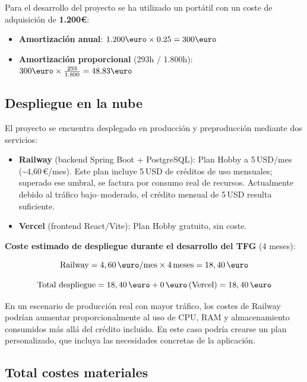 Para el desarrollo del proyecto se ha utilizado un portátil con un coste de adquisición de \textbf{1.200\euro}:

\begin{itemize}
	\item \textbf{Amortización anual}: $1.200\text{\euro} \times 0.25 = 300\text{\euro}$
	\item \textbf{Amortización proporcional} (293h / 1.800h): $300\text{\euro} \times \frac{293}{1.800} = 48{,}83\text{\euro}$
\end{itemize}

\subsection{Despliegue en la nube}

El proyecto se encuentra desplegado en producción y preproducción mediante dos servicios:

\begin{itemize}
	\item \textbf{Railway} (backend Spring Boot + PostgreSQL): Plan Hobby a 5\,USD/mes (\textasciitilde{}4,60\,\euro/mes). Este plan incluye 5\,USD de créditos de uso mensuales; superado ese umbral, se factura por consumo real de recursos. Actualmente debido al tráfico bajo--moderado, el crédito mensual de 5\,USD resulta suficiente.
	\item \textbf{Vercel} (frontend React/Vite): Plan Hobby gratuito, sin coste.
\end{itemize}

\textbf{Coste estimado de despliegue durante el desarrollo del TFG} (4 meses):

\begin{equation}
	\text{Railway} = 4,60\text{\,\euro/mes} \times 4\text{\,meses} = 18,40\text{\,\euro}
\end{equation}

\begin{equation}
	\text{Total despliegue} = 18,40\text{\,\euro} + 0\text{\,\euro\,(Vercel)} = 18,40\text{\,\euro}
\end{equation}

En un escenario de producción real con mayor tráfico, los costes de Railway podrían aumentar proporcionalmente al uso de CPU, RAM y almacenamiento consumidos más allá del crédito incluido. En este caso podría crearse un plan personalizado, que incluya las necesidades concretas de la aplicación.

\subsection{Total costes materiales}


